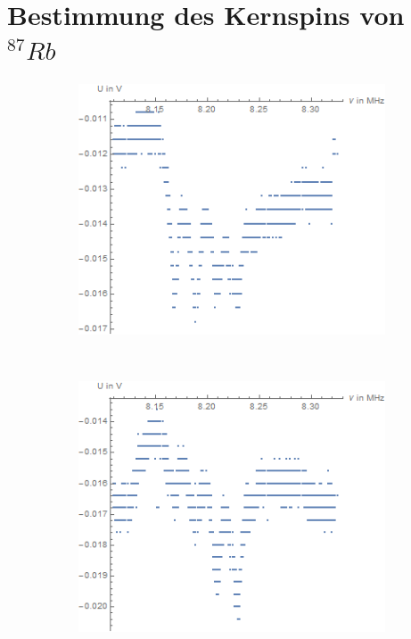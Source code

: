 \documentclass[bigchapter,colorback,accentcolor=tud4b,linedtoc,11pt]{tudreport}
\begin{document}
\section{Bestimmung des Kernspins von $^{87}Rb$}
\begin{figure}[H]
    \centering
    \begin{subfigure}[H]{0.44\textwidth}
        \includegraphics[width=1\textwidth]{img/2-1-plot1.png}
    \end{subfigure}%
    \qquad
    ~%
    \begin{subfigure}[H]{0.44\textwidth}
        \includegraphics[width=1\textwidth]{img/2-1-plot2.png}
    \end{subfigure}
\end{figure}
\end{document}
